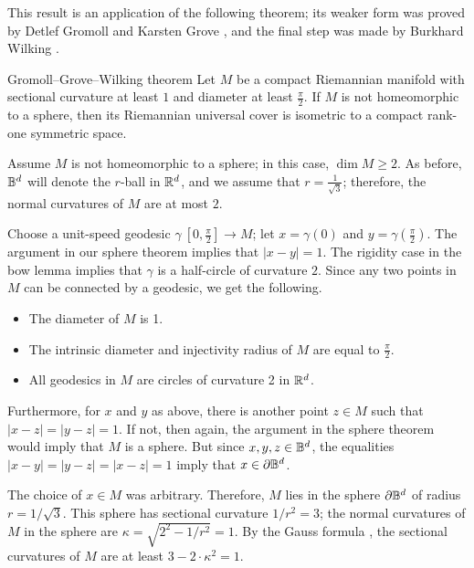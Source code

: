 \documentclass[a4paper,10pt]{article}
\begin{document}
\medskip


This result is an application of the following theorem;
its weaker form was proved by Detlef Gromoll and Karsten Grove \cite{gromoll-grove}, and
the final step was made by Burkhard Wilking \cite{wilking}.

\begin{thm}{Gromoll--Grove--Wilking theorem}\label{thm:GGW}
Let $M$ be a compact Riemannian manifold with sectional curvature at least $1$ and
diameter at least $\tfrac\pi2$.
If $M$ is not homeomorphic to a sphere, then its Riemannian universal cover is isometric to a compact rank-one symmetric space.
\end{thm}

Assume $M$ is not homeomorphic to a sphere;
in this case, $\dim M\ge 2$.
As before, $\mathbb{B}^d$ will denote the $r$-ball in $\mathbb{R}^d$, and we assume that $r=\tfrac1{\sqrt{3}}$;
therefore, the normal curvatures of $M$ are at most $2$.



Choose a unit-speed geodesic $\gamma\:[0,\tfrac\pi2]\to M$;
let $x=\gamma(0)$ and $y=\gamma(\tfrac\pi2)$.
The argument in our sphere theorem implies that $|x-y|=1$.
The rigidity case in the bow lemma implies that $\gamma$ is a half-circle of curvature $2$.
Since any two points in $M$ can be connected by a geodesic, we get the following.
\begin{itemize}
 \item The diameter of $M$ is 1.
 \item The intrinsic diameter and injectivity radius of $M$ are equal to $\tfrac\pi2$.
 \item All geodesics in $M$ are circles of curvature 2 in $\mathbb{R}^d$.
\end{itemize}

Furthermore, for $x$ and $y$ as above,
there is another point $z\in M$ such that $|x-z|=|y-z|=1$.
If not, then again, the argument in the sphere theorem would imply that $M$ is a sphere.
But since $x,y,z\in\mathbb{B}^d$,
the equalities $|x-y|=|y-z|=|x-z|=1$ imply that $x\in \partial \mathbb{B}^d$.

The choice of $x\in M$ was arbitrary.
Therefore, $M$ lies in the sphere $\partial \mathbb{B}^d$ of radius $r=1/\sqrt{3}$.
This sphere has sectional curvature $1/r^2=3$;
the normal curvatures of $M$ in the sphere are $\kappa=\sqrt{2^2-1/r^2}=1$.
By the Gauss formula \cite[Lemma 5]{petrunin2024}, the sectional curvatures of $M$ are at least $3-2\cdot \kappa^2=1$.
\end{document}
